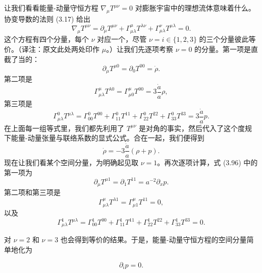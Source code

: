让我们看看能量-动量守恒方程 $\nabla_\mu T^{\mu\nu} = 0$ 对膨胀宇宙中的理想流体意味着什么。协变导数的法则 (3.17) 给出
\begin{equation*}
\nabla_\mu T^{\mu\nu} = \partial_\mu T^{\mu\nu} + \Gamma^\mu_{\mu\lambda}T^{\lambda\nu} + \Gamma^\nu_{\mu\lambda}T^{\mu\lambda} = 0.
\tag{3.96}
\end{equation*}
这个方程有四个分量，每个 $\nu$ 对应一个，尽管 $\nu = i \in \{1, 2, 3\}$ 的三个分量彼此等价。（译注：原文此处两处印作 $\mu$。）让我们先逐项考察 $\nu = 0$ 的分量。第一项是直截了当的：
\begin{equation*}
\partial_\mu T^{\mu 0} = \partial_0 T^{00} = \dot{\rho}.
\tag{3.97}
\end{equation*}
第二项是
\begin{equation*}
\Gamma^\mu_{\mu\lambda}T^{\lambda 0} = \Gamma^\mu_{\mu 0}T^{00} = 3\frac{\dot{a}}{a}\rho,
\tag{3.98}
\end{equation*}
第三项是
\begin{equation*}
\Gamma^0_{\mu\lambda}T^{\mu\lambda} = \Gamma^0_{00}T^{00} + \Gamma^0_{11}T^{11} + \Gamma^0_{22}T^{22} + \Gamma^0_{33}T^{33} = 3\frac{\dot{a}}{a}p.
\tag{3.99}
\end{equation*}
在上面每一组等式里，我们都先利用了 $T^{\mu\nu}$ 是对角的事实，然后代入了这个度规下能量-动量张量与联络系数的显式公式。合在一起，我们便得到
\begin{equation*}
\dot{\rho} = -3\frac{\dot{a}}{a}(\rho + p).
\tag{3.100}
\end{equation*}
现在让我们看某个空间分量，为明确起见取 $\nu = 1$。再次逐项计算，式 (3.96) 中的第一项为
\begin{equation*}
\partial_\mu T^{\mu 1} = \partial_1 T^{11} = a^{-2}\partial_x p.
\tag{3.101}
\end{equation*}
第二项和第三项是
\begin{equation*}
\Gamma^\mu_{\mu\lambda}T^{\lambda 1} = \Gamma^\mu_{\mu 1}T^{11} = 0,
\tag{3.102}
\end{equation*}
以及
\begin{equation*}
\Gamma^1_{\mu\lambda} T^{\mu\lambda} = \Gamma^1_{00} T^{00} + \Gamma^1_{11} T^{11} + \Gamma^1_{22} T^{22} + \Gamma^1_{33} T^{33} = 0. \tag{3.103}
\end{equation*}

对 $\nu=2$ 和 $\nu=3$ 也会得到等价的结果。于是，能量-动量守恒方程的空间分量简单地化为

\begin{equation*}
\partial_i p = 0. \tag{3.104}
\end{equation*}

